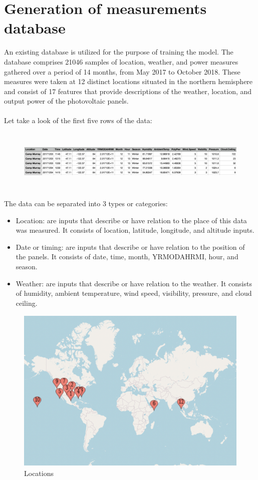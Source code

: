 \documentclass{report}
\begin{document}
\section{Generation of measurements database}
An existing database is utilized for the purpose of training the model. The database comprises 21046 samples of location, weather, and power measures gathered over a period of 14 months, from May 2017 to October 2018. These measures were taken at 12 distinct locations situated in the northern hemisphere and consist of 17 features that provide descriptions of the weather, location, and output power of the photovoltaic panels.\\
\\
Let take a look of the first five rows of the data:
\begin{figure}[h!]
    \centering
    \includegraphics[width=15cm, height=3cm] {rowsdata.png}
    \label{fig:my_label}
\end{figure}
\newpage
\hfill \break
The data can be separated into 3 types or categories: 
\begin{itemize}
    \item Location: are inputs that describe or have relation to the place of this data was measured. It consists of location, latitude, longitude, and altitude inputs.
    \item Date or timing: are inputs that describe or have relation to the position of the panels. It consists of date, time, month, YRMODAHRMI, hour, and season.
    \item Weather: are inputs that describe or have relation to the weather. It consists of humidity, ambient temperature, wind speed, visibility, pressure, and cloud ceiling.
\end{itemize}
\hfill \break
\begin{figure}[h!]
    \centering
    \includegraphics[width=13cm, height=8cm]{map.png}
    \caption{Locations}
    \label{fig:my_label}
\end{figure}
\end{document}
